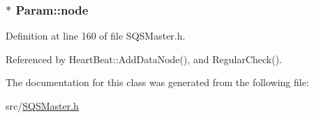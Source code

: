 \hypertarget{classParam_a3e74d625d823037deea01bb8933ee62c}{
\subsubsection[{node}]{$\ast$ {\bf \-Param\-::node}}}\label{d7/d16/classParam_a3e74d625d823037deea01bb8933ee62c}


\-Definition at line 160 of file \-S\-Q\-S\-Master.\-h.



\-Referenced by \-Heart\-Beat\-::\-Add\-Data\-Node(), and \-Regular\-Check().



\-The documentation for this class was generated from the following file\-:\begin{DoxyCompactItemize}
\item 
src/\hyperlink{SQSMaster_8h}{\-S\-Q\-S\-Master.\-h}\end{DoxyCompactItemize}

